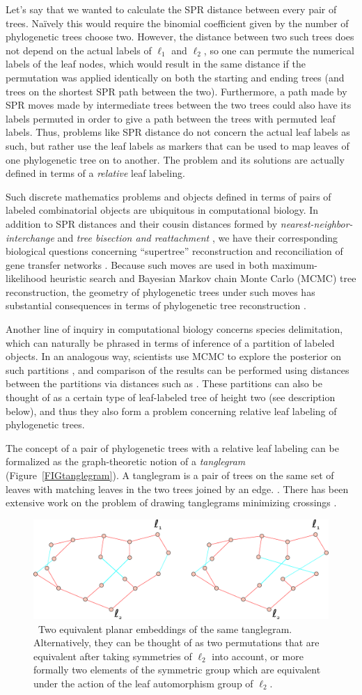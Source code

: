 \documentclass{amsart}
\newcommand{\arxiv}[1]{#1}
\newcommand{\FIGtanglegram}{\
\label{FIGtanglegram}
\begin{figure}
  \arxiv{\includegraphics[width=5in]{figures/relabeling-example}}
\caption{\
  Two equivalent planar embeddings of the same tanglegram.
  Alternatively, they can be thought of as two permutations that are equivalent after taking symmetries of $\ell_2$ into account, or more formally two elements of the symmetric group which are equivalent under the action of the leaf automorphism group of $\ell_2$.
}
\end{figure}
}
\begin{document}
Let's say that we wanted to calculate the SPR distance between every pair of trees.
Na\"ively this would require the binomial coefficient given by the number of phylogenetic trees choose two.
However, the distance between two such trees does not depend on the actual labels of $\ell_1$ and $\ell_2$, so one can permute the numerical labels of the leaf nodes, which would result in the same distance if the permutation was applied identically on both the starting and ending trees (and trees on the shortest SPR path between the two).
Furthermore, a path made by SPR moves made by intermediate trees between the two trees could also have its labels permuted in order to give a path between the trees with permuted leaf labels.
Thus, problems like SPR distance do not concern the actual leaf labels as such, but rather use the leaf labels as markers that can be used to map leaves of one phylogenetic tree on to another.
The problem and its solutions are actually defined in terms of a \emph{relative} leaf labeling.

Such discrete mathematics problems and objects defined in terms of pairs of labeled combinatorial objects are ubiquitous in computational biology.
In addition to SPR distances and their cousin distances formed by \emph{nearest-neighbor-interchange} and \emph{tree bisection and reattachment} \cite{wiki:treeRearrangement}, we have their corresponding biological questions concerning ``supertree'' reconstruction \cite{Whidden2014-ku} and reconciliation of gene transfer networks \cite{Boon2013-mc}.
Because such moves are used in both maximum-likelihood heuristic search and Bayesian Markov chain Monte Carlo (MCMC) tree reconstruction, the geometry of phylogenetic trees under such moves has substantial consequences in terms of phylogenetic tree reconstruction \cite{Whidden2014-yt}.

Another line of inquiry in computational biology concerns species delimitation, which can naturally be phrased in terms of inference of a partition of labeled objects.
In an analogous way, scientists use MCMC to explore the posterior on such partitions \cite{Yang2010-kc}, and comparison of the results can be performed using distances between the partitions via distances such as \cite{Gusfield2002-il}.
These partitions can also be thought of as a certain type of leaf-labeled tree of height two (see description below), and thus they also form a problem concerning relative leaf labeling of phylogenetic trees.

The concept of a pair of phylogenetic trees with a relative leaf labeling can be formalized as the graph-theoretic notion of a \emph{tanglegram} (Figure~\ref{FIGtanglegram}).
A tanglegram is a pair of trees on the same set of leaves with matching leaves in the two trees joined by an edge. \cite{Venkatachalam2010-zh}.
There has been extensive work on the problem of drawing tanglegrams minimizing crossings \cite{Buchin2008-lc,Lozano2008-tp,Bansal2009-ni,Bocker2009-xl,Fernau2010-an,Venkatachalam2010-zh}.
\FIGtanglegram
\end{document}
